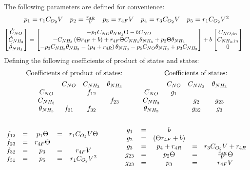 The following parameters are defined for convenience:
\begin{align*}
    \begin{matrix} 
    p_1 = r_1 C_{O_2} V
    &p_2 =  \frac{r_{4R}}{V}
    &p_3 = r_{4F} V
    &p_4 = r_3 C_{O_2} V
    &p_5 = r_1 C_{O_2} V^2
     \end{matrix}
\end{align*}
\begin{align*}
     \begin{bmatrix} \dot C_{NO} \\
        \dot C_{NH_3}\\
        \dot \theta_{NH_3}\\
         \end{bmatrix} &=
    \begin{bmatrix} 
        -p_1 C_{NO} \theta_{NH_3} \Theta
        -b C_{NO}
        \\
        -C_{NH_3} \left( \Theta r_{4F} + b \right)
        + r_{4F} \Theta C_{NH_3} \theta_{NH_3}
        + p_2 \Theta \theta_{NH_3}
        \\
        -p_3C_{NH_3} \theta_{NH_3}
        -\left( p_4 + r_{4R} \right) \theta_{NH_3}
        -p_5 C_{NO} \theta_{NH_3}
        + p_3 C_{NH_3}
     \end{bmatrix}
    + b \begin{bmatrix} C_{NO, in} \\ C_{NH_3, in} \\ 0 \end{bmatrix}
\end{align*}
Defining the following coefficients of product of states and states:
\begin{align*}
    \text{Coefficients of product of states:} &\qquad& \text{Coefficients of states:}\\
    \begin{matrix}              & C_{NO} & C_{NH_3} & \theta_{NH_3} \\
        C_{NO}        &        & f_{12}   &        \\
        C_{NH_3}      &        &          & f_{23} \\
        \theta_{NH_3} & f_{31} & f_{32}   & \end{matrix}
    &\qquad &
    \begin{matrix}              & C_{NO} & C_{NH_3} & \theta_{NH_3} \\
        C_{NO}        & g_1    &          &        \\
        C_{NH_3}      &        & g_{2}    & g_{23}        \\
        \theta_{NH_3} &        & g_{32}   & g_{3} \end{matrix}
\end{align*}
\begin{align*}
    \begin{matrix} 
    \\f_{12} &=& p_1 \Theta    &=& r_1 C_{O_2} V \Theta
    \\f_{23} &=& r_{4F} \Theta & &
    \\f_{32} &=& p_3           &=& r_{4F} V
    \\f_{31} &=& p_5           &=& r_1 C_{O_2} V^2 \end{matrix}
    \qquad \qquad
    \begin{matrix} 
    \\ g_1    &=& b                      & &
    \\ g_2    &=& \left( \Theta r_{4F} + b \right) & &
    \\ g_{3}  &=& p_4 + r_{4R}           &=& r_3 C_{O_2} V + r_{4R}
    \\ g_{23} &=& p_2 \Theta             &=&  \frac{r_{4R}}{V} \Theta
    \\ g_{23} &=& p_3                    &=& r_{4F} V
     \end{matrix}
\end{align*}
